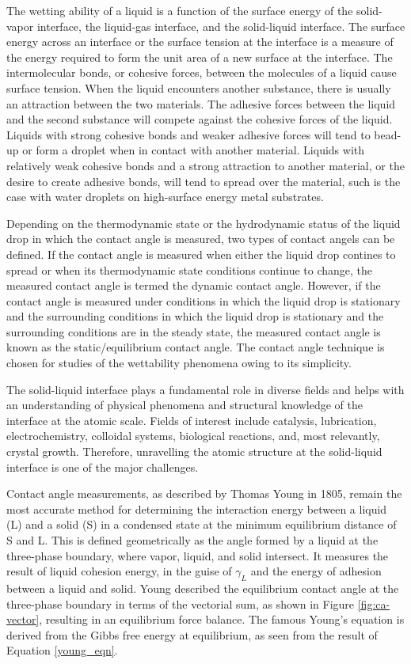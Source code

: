 The wetting ability of a liquid is a function of the surface energy of the solid-vapor interface, the liquid-gas interface, and the solid-liquid interface. The surface energy across an interface or the surface tension at the interface is a measure of the energy required to form the unit area of a new surface at the interface. The intermolecular bonds, or cohesive forces, between the molecules of a liquid cause surface tension. When the liquid encounters another substance, there is usually an attraction between the two materials. The adhesive forces between the liquid and the second substance will compete against the cohesive forces of the liquid.  Liquids with strong cohesive bonds and weaker adhesive forces will tend to bead-up or form a droplet when in contact with another material. Liquids with relatively weak cohesive bonds and a strong attraction to another material, or the desire to create adhesive bonds, will tend to spread over the material, such is the case with water droplets on high-surface energy metal substrates.

Depending on the thermodynamic state or the hydrodynamic status of the liquid drop in which the contact angle is measured, two types of contact angels can be defined. If the contact angle is measured when either the liquid drop contines to spread or when its thermodynamic state conditions continue to change, the measured contact angle is termed the dynamic contact angle. However, if the contact angle is measured under conditions in which the liquid drop is stationary and the surrounding conditions in which the liquid drop is stationary and the surrounding conditions are in the steady state, the measured contact angle is known as the static/equilibrium contact angle. The contact angle technique is chosen for studies of the wettability phenomena owing to its simplicity. 

The solid-liquid interface plays a fundamental role in diverse fields and helps with an understanding of physical phenomena and structural knowledge of the interface at the atomic scale. Fields of interest include catalysis, lubrication, electrochemistry, colloidal systems, biological reactions, and, most relevantly, crystal growth. Therefore, unravelling the atomic structure at the solid-liquid interface is one of the major challenges. 

Contact angle measurements, as described by Thomas Young in 1805, remain the most accurate method for determining the interaction energy between a liquid (L) and a solid (S) in a condensed state at the minimum equilibrium distance of S and L. This is defined geometrically as the angle formed by a liquid at the three-phase boundary, where vapor, liquid, and solid intersect. It measures the result of liquid cohesion energy, in the guise of $\gamma_{L}$ and the energy of adhesion between a liquid and solid. Young described the equilibrium contact angle at the three-phase boundary in terms of the vectorial sum, as shown in Figure \ref{fig:ca-vector}, resulting in an equilibrium force balance. The famous Young's equation is derived from the Gibbs free energy at equilibrium, as seen from the result of Equation \ref{young_eqn}. 

